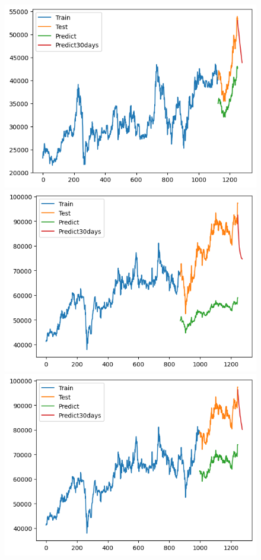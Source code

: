 \begin{figure}[H]
\begin{minipage}{0.15\textwidth}
    \centering
    \includegraphics[width=1\textwidth]{resources/chapter-5/result/BIDV_ RNN_9-1.png}
    \end{minipage}
    \hfill
    \begin{minipage}{0.15\textwidth}
    \centering
    \includegraphics[width=1\textwidth]{resources/chapter-5/result/VCB_ RNN_7-3.png}
    \end{minipage}
    \hfill
    \begin{minipage}{0.15\textwidth}
    \centering
    \includegraphics[width=1\textwidth]{resources/chapter-5/result/VCB_ RNN_8-2.png}

\end{minipage}
\end{figure}
